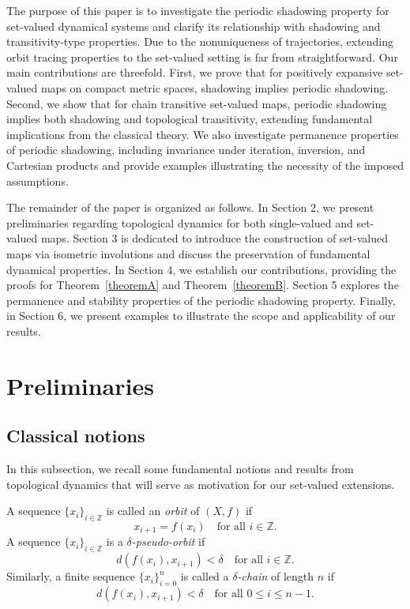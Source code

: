 \documentclass{amsart}
\theoremstyle{definition}
\begin{document}
The purpose of this paper is to investigate the periodic shadowing property for set-valued dynamical systems and clarify its relationship with shadowing and transitivity-type properties. Due to the nonuniqueness of trajectories, extending orbit tracing properties to the set-valued setting is far from straightforward. Our main contributions are threefold. First, we prove that for positively expansive set-valued maps on compact metric spaces, shadowing implies periodic shadowing. Second, we show that for chain transitive set-valued maps, periodic shadowing implies both shadowing and topological transitivity, extending fundamental implications from the classical theory. We also investigate permanence properties of periodic shadowing, including invariance under iteration, inversion, and Cartesian products and provide examples illustrating the necessity of the imposed assumptions.

The remainder of the paper is organized as follows. In Section 2, we present preliminaries regarding topological dynamics for both single-valued and set-valued maps. Section 3 is dedicated to introduce the construction of set-valued maps via isometric involutions and discuss the preservation of fundamental dynamical properties. In Section 4, we establish our  contributions, providing the proofs for Theorem~\ref{theoremA}  and Theorem~\ref{theoremB}. Section 5 explores the permanence and stability properties of the periodic shadowing property. Finally, in Section 6, we present examples to illustrate the scope and applicability of our results.



\section{Preliminaries}
\subsection{Classical notions}

In this subsection, we recall some fundamental notions and results from topological dynamics that will serve as motivation for our set-valued extensions.

A sequence $\{x_i\}_{i\in\mathbb{Z}}$ is called an \emph{orbit} of $(X,f)$ if
\[
x_{i+1}=f(x_i)
\quad \text{for all } i\in\mathbb{Z}.
\]
A sequence $\{x_i\}_{i\in\mathbb{Z}}$ is a \emph{$\delta$-pseudo-orbit} if
\[
d(f(x_i),x_{i+1})<\delta
\quad \text{for all } i\in\mathbb{Z}.
\]
Similarly, a finite sequence $\{x_i\}_{i=0}^{n}$ is called a \emph{$\delta$-chain} of length $n$ if
\[
d(f(x_i),x_{i+1})<\delta
\quad \text{for all } 0\leq i\leq n-1.
\]
\end{document}
